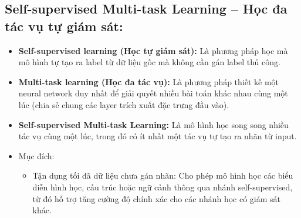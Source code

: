 \documentclass[12pt, a4paper, oneside]{book}
\theoremstyle{plain}
\numberwithin{equation}{chapter} \DeclareMathOperator{\Var}{var}
\begin{document}
\subsection{Self-supervised Multi-task Learning -- Học đa tác vụ tự giám sát:}
\begin{itemize}
    \item[--] \textbf{Self-supervised learning (Học tự giám sát):} Là phương pháp học mà mô hình tự tạo ra label từ dữ liệu gốc mà không cần gán label thủ công.
    \item[--] \textbf{Multi-task learning (Học đa tác vụ):} Là phương pháp thiết kế một neural network duy nhất để giải quyết nhiều bài toán khác nhau cùng một lúc (chia sẻ chung các layer trích xuất đặc trưng đầu vào).
    \item[--] \textbf{Self-supervised Multi-task Learning: } Là mô hình học song song nhiều tác vụ cùng một lúc, trong đó có ít nhất một tác vụ tự tạo ra nhãn từ input.
    \item[--] Mục đích:
    \begin{itemize}
        \item[+] Tận dụng tối đã dữ liệu chưa gán nhãn: Cho phép mô hình học các biểu diễn hình học, cấu trúc hoặc ngữ cảnh thông qua nhánh self-supervised, từ đó hỗ trợ tăng cường độ chính xác cho các nhánh học có giám sát khác.
    \end{itemize}     
\end{itemize}
\end{document}
